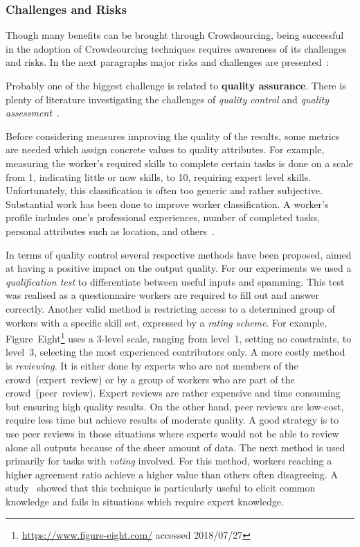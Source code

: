 \documentclass[draft,final]{vutinfth} %
\begin{document}
\subsubsection{Challenges and Risks}
Though many benefits can be brought through Crowdsourcing, being successful in the adoption of Crowdsourcing techniques requires awareness of its challenges and risks. In the next paragraphs major risks and challenges are presented~\cite{hossfeld2013}:

Probably one of the biggest challenge is related to \textbf{quality assurance}. There is plenty of literature investigating the challenges of \emph{quality control} and \emph{quality assessment}~\cite{allahbakhsh2013, daniel2018, hansen2013, hsueh2009}.

Before considering measures improving the quality of the results, some metrics are needed which assign concrete values to quality attributes. For example, measuring the worker's required skills to complete certain tasks is done on a scale from 1, indicating little or now skills, to 10, requiring expert level skills. Unfortunately, this classification is often too generic and rather subjective. Substantial work has been done to improve worker classification. A worker's profile includes one's professional experiences, number of completed tasks, personal attributes such as location, and others~\cite{daniel2018}. 

In terms of quality control several respective methods have been proposed, aimed at having a positive impact on the output quality. 
For our experiments we used a \emph{qualification test} to differentiate between useful inputs and spamming. This test was realised as a questionnaire workers are required to fill out and answer correctly. Another valid method is restricting access to a determined group of workers with a specific skill set, expressed by a \emph{rating scheme}. For example, Figure~Eight\footnote{\url{https://www.figure-eight.com/} accessed 2018/07/27} uses a 3-level scale, ranging from level~1, setting no constraints, to level~3, selecting the most experienced contributors only. A more costly method is \emph{reviewing}. It is either done by experts who are not members of the crowd~(expert~review) or by a group of workers who are part of the crowd~(peer~review). Expert reviews are rather expensive and time consuming but ensuring high quality results. On the other hand, peer reviews are low-cost, require less time but achieve results of moderate quality. A good strategy is to use peer reviews in those situations where experts would not be able to review alone all outputs because of the sheer amount of data. 
The next method is used primarily for tasks with \emph{voting} involved. For this method, workers reaching a higher agreement ratio achieve a higher value than  
others often disagreeing. A study~\cite{waggoner2014} showed that this technique is particularly useful to elicit common knowledge and fails in situations which require expert knowledge. 
\end{document}
